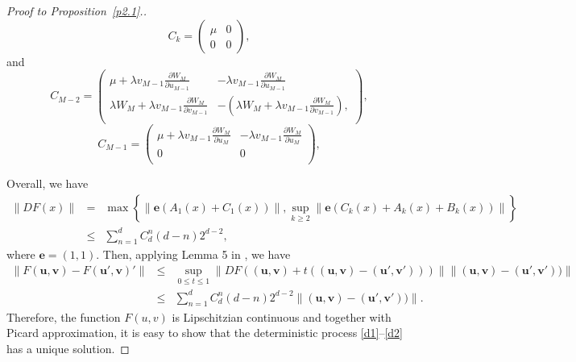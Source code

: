 \documentclass[12pt]{article}
\begin{document}
\begin{proof}[Proof to Proposition~\ref{p2.1}.]
\begin{equation*}
  C_{k}=\left(\begin{array}{cc}
          \mu & 0 \\
          0 & 0
        \end{array}\right),
\end{equation*}
and
\begin{equation*}
  C_{M-2}=\left(\begin{array}{cc}
          \mu+\lambda v_{M-1}\displaystyle\frac{\partial W_{M}}{\partial u_{M-1}}& -\lambda v_{M-1}\displaystyle\frac{\partial W_{M}}{\partial u_{M-1}} \\[4mm]
          \lambda W_{M}+\lambda v_{M-1}\displaystyle\frac{\partial W_{M}}{\partial v_{M-1}} & -\left(\lambda W_{M}+\lambda v_{M-1}\displaystyle\frac{\partial W_{M}}{\partial v_{M-1}}\right),\\
        \end{array}\right),
\end{equation*}
\begin{equation*}
  C_{M-1}=\left(
            \begin{array}{cc}
               \mu+\lambda v_{M-1}\displaystyle\frac{\partial W_{M}}{\partial u_{M}} & -\lambda v_{M-1}\displaystyle\frac{\partial W_{M}}{\partial u_{M}} \\[4mm]
              0 & 0 \\
            \end{array}
          \right),
\end{equation*}

Overall, we have
\begin{eqnarray*}
 \| DF(x)\|&=&\max\left\{\| \textbf{e}(A_1(x)+C_1(x))\|,\sup\limits_{k\geq 2}\| \textbf{e}(C_{k}(x)+A_{k}(x)+B_{k}(x))\|\right\}\\
  &\leq& \sum\limits_{n=1}^{d}C_d^n(d-n)2^{d-2},
\end{eqnarray*}
where $\textbf{e}=(1,1)$.
Then, applying Lemma 5 in \cite{lql}, we have
\begin{eqnarray*}
 \|F(\textbf{u},\textbf{v})-F(\textbf{u}',\textbf{v})'\|&\leq&\sup\limits_{0\leq t\leq1}\| DF((\textbf{u},\textbf{v})+t((\textbf{u},\textbf{v})-(\textbf{u}',\textbf{v}')))\|\|(\textbf{u},\textbf{v})-(\textbf{u}',\textbf{v}'))\|\\[4mm]
&\leq& \sum\limits_{n=1}^{d}C_d^n(d-n)2^{d-2}\|(\textbf{u},\textbf{v})-(\textbf{u}',\textbf{v}'))\|.
\end{eqnarray*}
Therefore, the function $F(u,v)$ is Lipschitzian continuous and together with Picard approximation, it is easy to show that the deterministic process \eqref{d1}--\eqref{d2} has a unique solution.
\end{proof}
\end{document}
